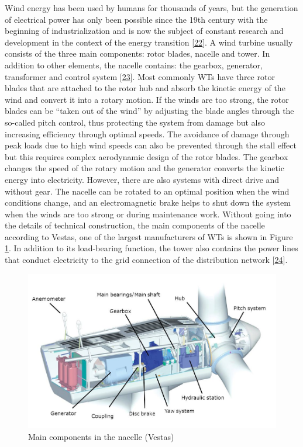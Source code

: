 \documentclass[a4paper,11pt]{article}
\begin{document}
Wind energy has been used by humans for thousands of years, but the generation of electrical power has only been possible since the 19th century with the beginning of industrialization and is now the subject of constant research and development in the context of the energy transition {[}\protect\hyperlink{ref-Wikipedia.2021}{22}{]}. A wind turbine usually consists of the three main components: rotor blades, nacelle and tower. In addition to other elements, the nacelle contains: the gearbox, generator, transformer and control system {[}\protect\hyperlink{ref-MladenBosnjakovic.2013}{23}{]}. Most commonly WTs have three rotor blades that are attached to the rotor hub and absorb the kinetic energy of the wind and convert it into a rotary motion. If the winds are too strong, the rotor blades can be ``taken out of the wind'' by adjusting the blade angles through the so-called pitch control, thus protecting the system from damage but also increasing efficiency through optimal speeds. The avoidance of damage through peak loads due to high wind speeds can also be prevented through the stall effect but this requires complex aerodynamic design of the rotor blades. The gearbox changes the speed of the rotary motion and the generator converts the kinetic energy into electricity. However, there are also systems with direct drive and without gear. The nacelle can be rotated to an optimal position when the wind conditions change, and an electromagnetic brake helps to shut down the system when the winds are too strong or during maintenance work. Without going into the details of technical construction, the main components of the nacelle according to Vestas, one of the largest manufacturers of WTs is shown in Figure \ref{fig:nacelle}. In addition to its load-bearing function, the tower also contains the power lines that conduct electricity to the grid connection of the distribution network {[}\protect\hyperlink{ref-NetzKonstrukteur.16.11.2020}{24}{]}.
\begin{figure}[H]

{\centering \includegraphics[width=0.9\linewidth]{figures/nacelle} 

}

\caption{Main components in the nacelle (Vestas)}\label{fig:nacelle}
\end{figure}
\end{document}
